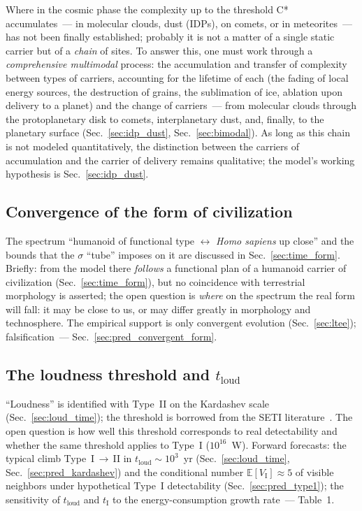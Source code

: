 \documentclass[11pt,a4paper]{article}
\begin{document}
Where in the cosmic phase the complexity up to the threshold C* accumulates~--- in molecular clouds, dust (IDPs), on comets, or in meteorites~--- has not been finally established; probably it is not a matter of a single static carrier but of a \emph{chain} of sites. To answer this, one must work through a \emph{comprehensive multimodal} process: the accumulation and transfer of complexity between types of carriers, accounting for the lifetime of each (the fading of local energy sources, the destruction of grains, the sublimation of ice, ablation upon delivery to a planet) and the change of carriers~--- from molecular clouds through the protoplanetary disk to comets, interplanetary dust, and, finally, to the planetary surface (Sec.~\ref{sec:idp_dust}, Sec.~\ref{sec:bimodal}). As long as this chain is not modeled quantitatively, the distinction between the carriers of accumulation and the carrier of delivery remains qualitative; the model's working hypothesis is Sec.~\ref{sec:idp_dust}.

\subsection{Convergence of the form of civilization}
\label{sec:open_civ_form}

The spectrum ``humanoid of functional type $\leftrightarrow$ \emph{Homo sapiens} up close'' and the bounds that the $\sigma$ ``tube'' imposes on it are discussed in Sec.~\ref{sec:time_form}. Briefly: from the model there \emph{follows} a functional plan of a humanoid carrier of civilization (Sec.~\ref{sec:time_form}), but no coincidence with terrestrial morphology is asserted; the open question is \emph{where} on the spectrum the real form will fall: it may be close to us, or may differ greatly in morphology and technosphere. The empirical support is only convergent evolution (Sec.~\ref{sec:ltee}); falsification~--- Sec.~\ref{sec:pred_convergent_form}.

\subsection{The loudness threshold and \texorpdfstring{$t_{\mathrm{loud}}$}{t\_loud}}
\label{sec:open_loud}

``Loudness'' is identified with Type~II on the Kardashev scale (Sec.~\ref{sec:loud_time}); the threshold is borrowed from the SETI literature~\cite{Wright2014,Hanson2021}. The open question is how well this threshold corresponds to real detectability and whether the same threshold applies to Type~I ($10^{16}$~W). Forward forecasts: the typical climb Type~I\,$\to$\,II in $t_{\mathrm{loud}} \sim 10^3$~yr (Sec.~\ref{sec:loud_time}, Sec.~\ref{sec:pred_kardashev}) and the conditional number $\mathbb{E}[V_{\mathrm{I}}] \approx 5$ of visible neighbors under hypothetical Type~I detectability (Sec.~\ref{sec:pred_type1}); the sensitivity of $t_{\mathrm{loud}}$ and $t_{\mathrm{I}}$ to the energy-consumption growth rate~--- Table~1.
\end{document}
